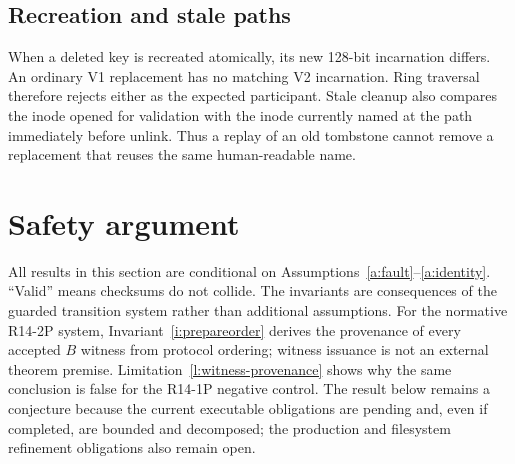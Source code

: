 \documentclass[10pt,twocolumn]{article}
\theoremstyle{remark}
\begin{document}
\subsection{Recreation and stale paths}

When a deleted key is recreated atomically, its new 128-bit incarnation differs. An ordinary V1
replacement has no matching V2 incarnation. Ring traversal therefore rejects either as the expected
participant. Stale cleanup also compares the inode opened for validation with the inode currently
named at the path immediately before unlink. Thus a replay of an old tombstone cannot remove a
replacement that reuses the same human-readable name.

\section{Safety argument}

All results in this section are conditional on Assumptions~\ref{a:fault}--\ref{a:identity}.
``Valid'' means checksums do not collide. The invariants are consequences of the guarded transition
system rather than additional assumptions. For the normative R14-2P system,
Invariant~\ref{i:prepareorder} derives the provenance of every accepted $B$ witness from protocol
ordering; witness issuance is not an external theorem premise. Limitation~\ref{l:witness-provenance}
shows why the same conclusion is false for the R14-1P negative control. The result below remains a
conjecture because the current executable obligations are pending and, even if completed, are
bounded and decomposed; the production and filesystem refinement obligations also remain open.
\end{document}

